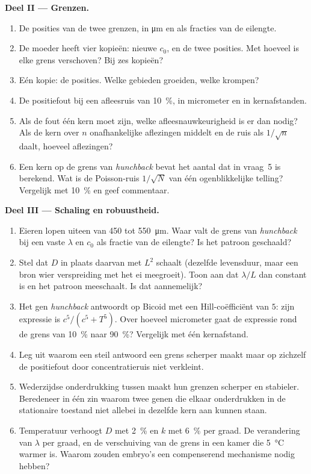 \begin{problem}
\medskip
\noindent\textbf{Deel II --- Grenzen.}
\begin{enumerate}[resume]
  \item De posities van de twee grenzen, in \unit{\micro m} en als
        fracties van de eilengte.
  \item De moeder heeft vier kopieën: nieuwe $c_{0}$, en de twee
        posities. Met hoeveel is elke grens verschoven? Bij zes kopieën?
  \item Eén kopie: de posities. Welke gebieden groeiden, welke krompen?
  \item De positiefout bij een afleesruis van \qty{10}{\%}, in
        micrometer en in kernafstanden.
  \item Als de fout één kern moet zijn, welke afleesnauwkeurigheid is
        er dan nodig? Als de kern over $n$ onafhankelijke aflezingen
        middelt en de ruis als $1/\sqrt{n}$ daalt, hoeveel aflezingen?
  \item Een kern op de grens van \emph{hunchback} bevat het aantal dat
        in vraag~5 is berekend. Wat is de Poisson-ruis
        $1/\sqrt{N}$ van één ogenblikkelijke telling? Vergelijk met
        \qty{10}{\%} en geef commentaar.
\end{enumerate}

\medskip
\noindent\textbf{Deel III --- Schaling en robuustheid.}
\begin{enumerate}[resume]
  \item Eieren lopen uiteen van \qty{450}{} tot \qty{550}{\micro m}.
        Waar valt de grens van \emph{hunchback} bij een vaste $\lambda$
        en $c_{0}$ als fractie van de eilengte? Is het patroon geschaald?
  \item Stel dat $D$ in plaats daarvan met $L^{2}$ schaalt (dezelfde
        levensduur, maar een bron wier verspreiding met het ei
        meegroeit). Toon aan dat $\lambda/L$ dan constant is en het
        patroon meeschaalt. Is dat aannemelijk?
  \item Het gen \emph{hunchback} antwoordt op Bicoid met een
        Hill-coëfficiënt van $5$: zijn expressie is $c^{5}/(c^{5} + T^{5})$.
        Over hoeveel micrometer gaat de expressie rond de grens van
        \qty{10}{\%} naar \qty{90}{\%}? Vergelijk met één kernafstand.
  \item Leg uit waarom een steil antwoord een grens scherper maakt maar
        op zichzelf de positiefout door concentratieruis niet verkleint.
  \item Wederzijdse onderdrukking tussen  maakt hun grenzen
        scherper en stabieler. Beredeneer in één zin waarom twee genen
        die elkaar onderdrukken in de stationaire toestand niet allebei
        in dezelfde kern aan kunnen staan.
  \item Temperatuur verhoogt $D$ met \qty{2}{\%} en $k$ met
        \qty{6}{\%} per graad. De verandering van $\lambda$ per graad,
        en de verschuiving van de grens in een kamer die
        \qty{5}{\celsius} warmer is. Waarom zouden embryo's een
        compenserend mechanisme nodig hebben?
\end{enumerate}


\end{problem}
